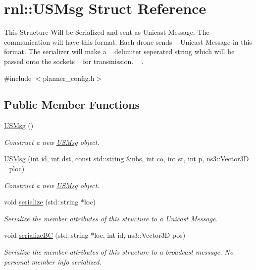 \hypertarget{structrnl_1_1USMsg}{}\section{rnl\+:\+:U\+S\+Msg Struct Reference}
\label{structrnl_1_1USMsg}


This Structure Will be Serialized and sent as Unicast Message. The ~\newline
communication will have this format. Each drone sends ~\newline
Unicast Message in this format. The serializer will make a ~\newline
delimiter seperated string which will be passed onto the sockets ~\newline
for transmission. ~\newline
.  




{\ttfamily \#include $<$planner\+\_\+config.\+h$>$}

\subsection*{Public Member Functions}
\begin{DoxyCompactItemize}
\item 
\mbox{\label{structrnl_1_1USMsg_a54bfe09cb24305193f6877354bdfcf18}} 
\hyperlink{structrnl_1_1USMsg_a54bfe09cb24305193f6877354bdfcf18}{U\+S\+Msg} ()
\begin{DoxyCompactList}\small\item\em Construct a new \hyperlink{structrnl_1_1USMsg}{U\+S\+Msg} object. \end{DoxyCompactList}\item 
\hyperlink{structrnl_1_1USMsg_a86f07d5717ea317a1a270f6e3272ab25}{U\+S\+Msg} (int id, int dst, const std\+::string \&\hyperlink{structrnl_1_1USMsg_a07dbb4f4edfc36645da120c1a6d1a27a}{nbs}, int co, int st, int p, ns3\+::\+Vector3D \+\_\+ploc)
\begin{DoxyCompactList}\small\item\em Construct a new \hyperlink{structrnl_1_1USMsg}{U\+S\+Msg} object. \end{DoxyCompactList}\item 
void \hyperlink{structrnl_1_1USMsg_ad940de5a03b2ad545557cf202591df5c}{serialize} (std\+::string $\ast$loc)
\begin{DoxyCompactList}\small\item\em Serialize the member attributes of this structure to a Unicast Message. \end{DoxyCompactList}\item 
void \hyperlink{structrnl_1_1USMsg_a16f56ad38f83ed4071aa24f11a482c75}{serialize\+BC} (std\+::string $\ast$loc, int id, ns3\+::\+Vector3D pos)
\begin{DoxyCompactList}\small\item\em Serialize the member attributes of this structure to a broadcast message. No personal member info serialized. \end{DoxyCompactList}\end{DoxyCompactItemize}
